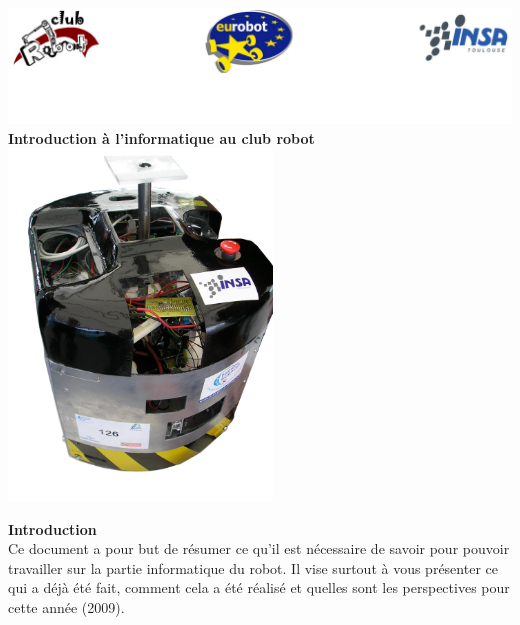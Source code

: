 \documentclass[a4paper]{article}
\begin{document}
\begin{center}
\includegraphics[width=16cm]{images/logos.png}
\Huge{\textbf{Introduction à l'informatique au club robot\\}}
\vspace{3cm}
\includegraphics[width=7cm]{images/pandora.png}
\end{center}

\newpage

\textbf{Introduction}\\

Ce document a pour but de résumer ce qu'il est nécessaire de savoir pour pouvoir travailler sur la partie informatique du robot. Il vise surtout à vous présenter ce qui a déjà été fait, comment cela a été réalisé et quelles sont les perspectives pour cette année (2009).

\tableofcontents







\end{document}
